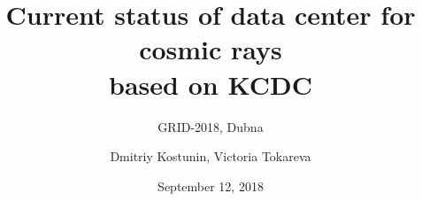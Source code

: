 \documentclass[18pt]{beamer}
\title[Cosmic rays data center]{Current status of data center for cosmic rays \\based on KCDC}
\subtitle{GRID-2018, Dubna}
\author{Dmitriy Kostunin, Victoria Tokareva}
\institute{Institute for Nuclear Physics (IKP)}
\date{September 12, 2018}
\begin{document}

\begin{frame}
\titlepage
\end{frame}

\end{document}
